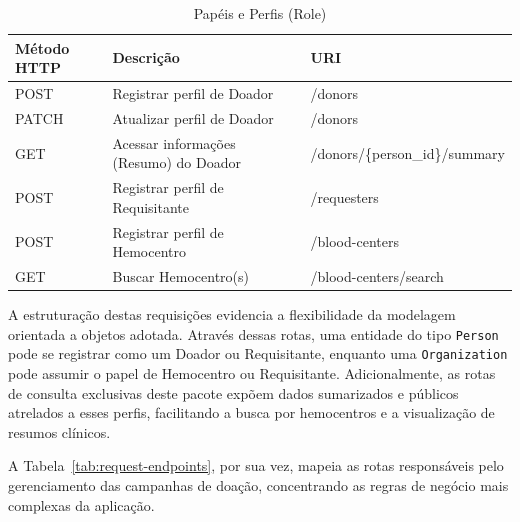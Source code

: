 \begin{table}[H]
  \centering
  \caption{Papéis e Perfis (Role)}
  \label{tab:role-endpoints}
  \begin{tabularx}{\textwidth}{>{\raggedright\arraybackslash}p{2.5cm} >{\raggedright\arraybackslash}X >{\ttfamily\raggedright\arraybackslash}p{6cm}}
    \toprule
    \textbf{Método HTTP} & \textbf{Descrição} & \textbf{URI} \\
    \midrule
    POST & Registrar perfil de Doador & /donors \\
    PATCH & Atualizar perfil de Doador & /donors \\
    GET & Acessar informações (Resumo) do Doador & /donors/\{person\_id\}/summary \\
    POST & Registrar perfil de Requisitante & /requesters \\
    POST & Registrar perfil de Hemocentro & /blood-centers \\
    GET & Buscar Hemocentro(s) & /blood-centers/search \\
    \bottomrule
  \end{tabularx}
\end{table}

A estruturação destas requisições evidencia a flexibilidade da modelagem orientada a objetos adotada. Através dessas rotas, uma entidade do tipo \texttt{Person} pode se registrar como um Doador ou Requisitante, enquanto uma \texttt{Organization} pode assumir o papel de Hemocentro ou Requisitante. Adicionalmente, as rotas de consulta exclusivas deste pacote expõem dados sumarizados e públicos atrelados a esses perfis, facilitando a busca por hemocentros e a visualização de resumos clínicos.

A Tabela~\ref{tab:request-endpoints}, por sua vez, mapeia as rotas responsáveis pelo gerenciamento das campanhas de doação, concentrando as regras de negócio mais complexas da aplicação.

